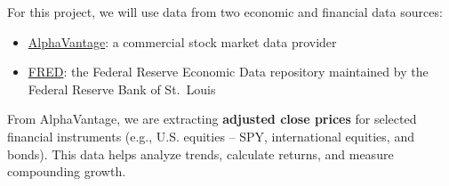 \documentclass[
  letterpaper,
  DIV=11,
  numbers=noendperiod]{scrartcl}
\begin{document}
For this project, we will use data from two economic and financial data
sources:

\begin{itemize}
\item
  \href{https://www.alphavantage.co/}{AlphaVantage}: a commercial stock
  market data provider
\item
  \href{https://fred.stlouisfed.org/}{FRED}: the Federal Reserve
  Economic Data repository maintained by the Federal Reserve Bank of
  St.~Louis
\end{itemize}

From AlphaVantage, we are extracting \textbf{adjusted close prices} for
selected financial instruments (e.g., U.S. equities -- SPY,
international equities, and bonds). This data helps analyze trends,
calculate returns, and measure compounding growth.
\end{document}
